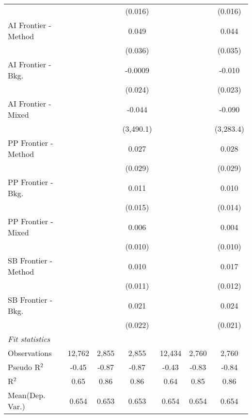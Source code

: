 \begin{tabular}{lcccccc}
                        &                &         & (0.016)   &                &         & (0.016)\\   
   AI Frontier - Method &                &         & 0.049     &                &         & 0.044\\   
                        &                &         & (0.036)   &                &         & (0.035)\\   
   AI Frontier - Bkg.   &                &         & -0.0009   &                &         & -0.010\\   
                        &                &         & (0.024)   &                &         & (0.023)\\   
   AI Frontier - Mixed  &                &         & -0.044    &                &         & -0.090\\   
                        &                &         & (3,490.1) &                &         & (3,283.4)\\   
   PP Frontier - Method &                &         & 0.027     &                &         & 0.028\\   
                        &                &         & (0.029)   &                &         & (0.029)\\   
   PP Frontier - Bkg.   &                &         & 0.011     &                &         & 0.010\\   
                        &                &         & (0.015)   &                &         & (0.014)\\   
   PP Frontier - Mixed  &                &         & 0.006     &                &         & 0.004\\   
                        &                &         & (0.010)   &                &         & (0.010)\\   
   SB Frontier - Method &                &         & 0.010     &                &         & 0.017\\   
                        &                &         & (0.011)   &                &         & (0.012)\\   
   SB Frontier - Bkg.   &                &         & 0.021     &                &         & 0.024\\   
                        &                &         & (0.022)   &                &         & (0.021)\\   
   \midrule
   \emph{Fit statistics}\\
   Observations         & 12,762         & 2,855   & 2,855     & 12,434         & 2,760   & 2,760\\  
   Pseudo R$^2$         & -0.45          & -0.87   & -0.87     & -0.43          & -0.83   & -0.84\\  
   R$^2$                & 0.65           & 0.86    & 0.86      & 0.64           & 0.85    & 0.86\\  
Mean(Dep. Var.) & 0.654 & 0.653 & 0.653 & 0.654 & 0.654 & 0.654 \\
   

\end{tabular}
